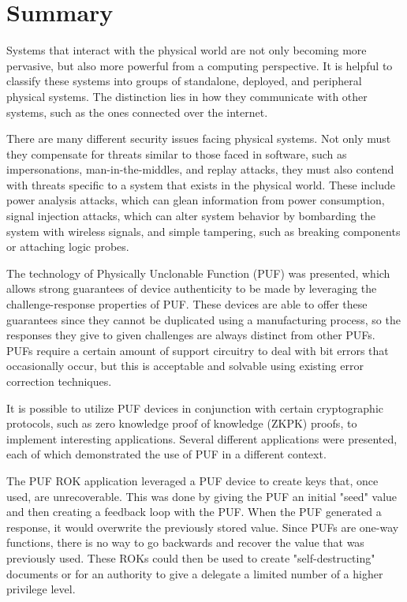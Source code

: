 %
%

\chapter{Summary}
\label{chapter:conclusion}

Systems that interact with the physical world are not only becoming more pervasive, but also more powerful
from a computing perspective. It is helpful to classify these systems into groups of standalone, deployed, and
peripheral physical systems. The distinction lies in how they communicate with other systems,
such as the ones connected over the internet.

There are many different security issues facing physical systems. Not only must they compensate for threats similar
to those faced in software, such as impersonations, man-in-the-middles, and replay attacks, they must also
contend with threats specific to a system that exists in the physical world. These include power analysis attacks,
which can glean information from power consumption, signal injection attacks, which can alter system behavior by
bombarding the system with wireless signals, and simple tampering, such as breaking components or attaching logic
probes.

The technology of Physically Unclonable Function (PUF) was presented, which allows strong guarantees of device authenticity
to be made by leveraging the challenge-response properties of PUF. These devices are able to offer these guarantees
since they cannot be duplicated using a manufacturing process, so the responses they give to given challenges are
always distinct from other PUFs. PUFs require a certain amount of support circuitry to deal with bit errors that occasionally
occur, but this is acceptable and solvable using existing error correction techniques.

It is possible to utilize PUF devices in conjunction with certain cryptographic protocols, such as zero knowledge proof
of knowledge (ZKPK) proofs, to implement interesting applications. Several different applications were presented, each of
which demonstrated the use of PUF in a different context.

The PUF ROK application leveraged a PUF device to create keys that, once used, are unrecoverable. This was done by
giving the PUF an initial "seed" value and then creating a feedback loop with the PUF. When the PUF generated a response,
it would overwrite the previously stored value. Since PUFs are one-way functions, there is no way to go backwards and
recover the value that was previously used. These ROKs could then be used to create "self-destructing" documents
or for an authority to give a delegate a limited number of a higher privilege level.

